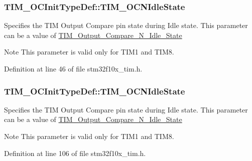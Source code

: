 \subsubsection[{\texorpdfstring{T\+I\+M\+\_\+\+O\+C\+N\+Idle\+State}{TIM_OCNIdleState}}]{ T\+I\+M\+\_\+\+O\+C\+Init\+Type\+Def\+::\+T\+I\+M\+\_\+\+O\+C\+N\+Idle\+State}\hypertarget{struct_t_i_m___o_c_init_type_def_a9c1eab3bbc010aa2c14343fea21fb851}{}\label{struct_t_i_m___o_c_init_type_def_a9c1eab3bbc010aa2c14343fea21fb851}
Specifies the T\+IM Output Compare pin state during Idle state. This parameter can be a value of \hyperlink{group___t_i_m___output___compare___n___idle___state}{T\+I\+M\+\_\+\+Output\+\_\+\+Compare\+\_\+\+N\+\_\+\+Idle\+\_\+\+State} \begin{DoxyNote}{Note}
This parameter is valid only for T\+I\+M1 and T\+I\+M8. 
\end{DoxyNote}


Definition at line 46 of file stm32f10x\+\_\+tim.\+h.

\subsubsection[{\texorpdfstring{T\+I\+M\+\_\+\+O\+C\+N\+Idle\+State}{TIM_OCNIdleState}}]{ T\+I\+M\+\_\+\+O\+C\+Init\+Type\+Def\+::\+T\+I\+M\+\_\+\+O\+C\+N\+Idle\+State}\hypertarget{struct_t_i_m___o_c_init_type_def_a6cbbe6eb87c2ab49e4d68fa9703ce949}{}\label{struct_t_i_m___o_c_init_type_def_a6cbbe6eb87c2ab49e4d68fa9703ce949}
Specifies the T\+IM Output Compare pin state during Idle state. This parameter can be a value of \hyperlink{group___t_i_m___output___compare___n___idle___state}{T\+I\+M\+\_\+\+Output\+\_\+\+Compare\+\_\+\+N\+\_\+\+Idle\+\_\+\+State} \begin{DoxyNote}{Note}
This parameter is valid only for T\+I\+M1 and T\+I\+M8. 
\end{DoxyNote}


Definition at line 106 of file stm32f10x\+\_\+tim.\+h.

